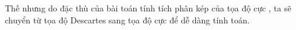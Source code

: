 \documentclass[preview]{standalone}
\begin{document}
\begin{center}
Thế nhưng do đặc thù của bài toán tính tích phân kép của tọa độ cực , ta sẽ chuyển từ tọa độ Descartes sang tọa độ cực để dễ dàng tính toán.
\end{center}
\end{document}
